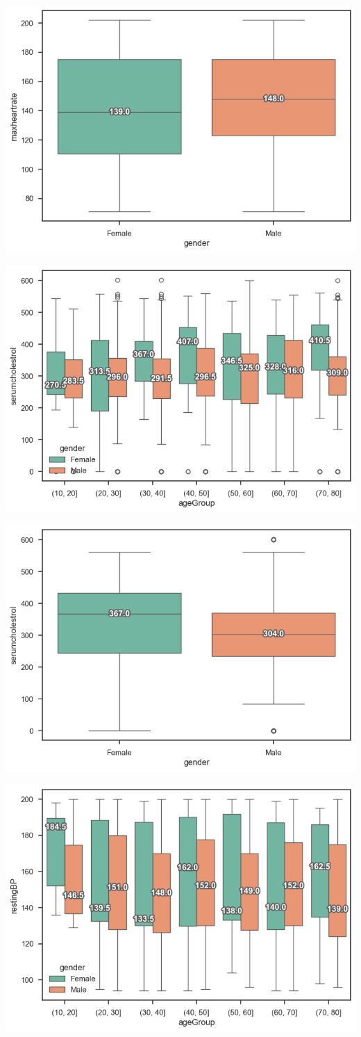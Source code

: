 \includegraphics[width=0.8\linewidth]{media/boxplot-04-gender-heartrate.png}

\includegraphics[width=0.8\linewidth]{media/boxplot-05-agegroup-gender-cholesterol.png}

\includegraphics[width=0.8\linewidth]{media/boxplot-06-gender-cholesterol.png}

\includegraphics[width=0.8\linewidth]{media/boxplot-07-agegroup-gender-bp.png}

